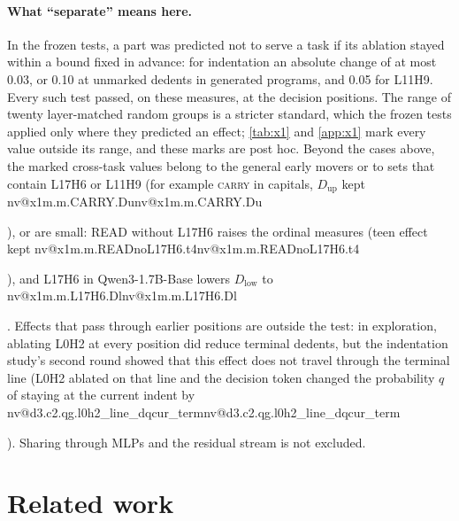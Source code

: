 \documentclass[11pt]{article}
\makeatletter
\newcommand{\nv}[1]{\ifcsname nv@#1\endcsname\csname nv@#1\endcsname\else\PackageError{numbers}{Unknown number key #1}{}\fi}
\newcommand{\hd}[2]{L#1H#2}
\newcommand{\carry}{\textsc{carry}}
\newcommand{\qbig}{Qwen3-1.7B-Base}
\newcommand{\xm}[2]{\nv{x1m.m.#1.#2}}
\makeatother
\begin{document}
\paragraph{What ``separate'' means here.} In the frozen tests, a part was predicted not to serve a task if its ablation stayed within a bound fixed in advance: for indentation an absolute change of at most 0.03, or 0.10 at unmarked dedents in generated programs, and 0.05 for \hd{11}{9}. Every such test passed, on these measures, at the decision positions. The range of twenty layer-matched random groups is a stricter standard, which the frozen tests applied only where they predicted an effect; \cref{tab:x1} and \cref{app:x1} mark every value outside its range, and these marks are post hoc. Beyond the cases above, the marked cross-task values belong to the general early movers or to sets that contain \hd{17}{6} or \hd{11}{9} (for example \carry{} in capitals, $D_{\text{up}}$ kept \xm{CARRY}{Du}), or are small: READ without \hd{17}{6} raises the ordinal measures (teen effect kept \xm{READnoL17H6}{t4}), and \hd{17}{6} in \qbig{} lowers $D_{\text{low}}$ to \xm{L17H6}{Dl}. Effects that pass through earlier positions are outside the test: in exploration, ablating \hd{0}{2} at every position did reduce terminal dedents, but the indentation study's second round showed that this effect does not travel through the terminal line (\hd{0}{2} ablated on that line and the decision token changed the probability $q$ of staying at the current indent by \nv{d3.c2.qg.l0h2_line_dqcur_term}). Sharing through MLPs and the residual stream is not excluded.

\section{Related work}
\label{sec:related}
\end{document}
